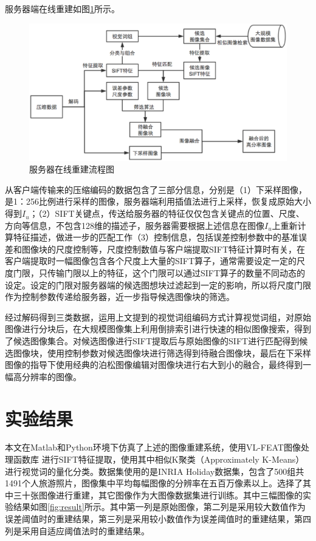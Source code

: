 \documentclass[UTF8]{csoarticle}
\begin{document}
服务器端在线重建如图\ref{fig:serverOnline}所示。
\begin{figure}
\centering\includegraphics[width=15cm]{serverOnline}
\caption{服务器在线重建流程图}
\label{fig:serverOnline}
\end{figure}

从客户端传输来的压缩编码的数据包含了三部分信息，分别是（1）下采样图像，是1：256比例进行采样的图像，服务器端利用插值法进行上采样，恢复成原始大小得到\(I_u\)；（2）SIFT关键点，传送给服务器的特征仅仅包含关键点的位置、尺度、方向等信息，不包含128维的描述子，服务器需要根据上述信息在图像\(I_u\)上重新计算特征描述，做进一步的匹配工作（3）控制信息，包括误差控制参数中的基准误差和图像块的尺度控制等，尺度控制数值与客户端提取SIFT特征计算时有关，在客户端提取时一幅图像包含各个尺度上大量的SIFT算子，通常需要设定一定的尺度门限，只传输门限以上的特征，这个门限可以通过SIFT算子的数量不同动态的设定。设定的门限对服务器端的候选图想块过滤起到一定的影响，所以将尺度门限作为控制参数传递给服务器，近一步指导候选图像块的筛选。

经过解码得到三类数据，运用上文提到的视觉词组编码方式计算视觉词组，对原始图像进行分块后，在大规模图像集上利用倒排索引进行快速的相似图像搜索，得到了候选图像集合。对候选图像进行SIFT提取后与原始图像的SIFT进行匹配得到候选图像块，使用控制参数对候选图像块进行筛选得到待融合图像块，最后在下采样图像的指导下使用经典的泊松图像编辑\cite{Perez:2003ul}对图像块进行右大到小的融合，最终得到一幅高分辨率的图像。

\section{实验结果}
本文在Matlab和Python环境下仿真了上述的图像重建系统，使用VL-FEAT图像处理函数库
\cite{vl_feat}进行SIFT特征提取，使用其中相似K聚类（Approximately K-Means）进行视觉词的量化分类。数据集使用的是INRIA Holiday数据集\cite{INRIA}，包含了500组共1491个人旅游照片，图像集中平均每幅图像的分辨率在五百万像素以上。选择了其中三十张图像进行重建，其它图像作为大图像数据集进行训练。其中三幅图像的实验结果如图\ref{fig:result}所示。其中第一列是原始图像，第二列是采用较大数值作为误差阈值时的重建结果，第三列是采用较小数值作为误差阈值时的重建结果，第四列是采用自适应阈值法时的重建结果。
\end{document}
